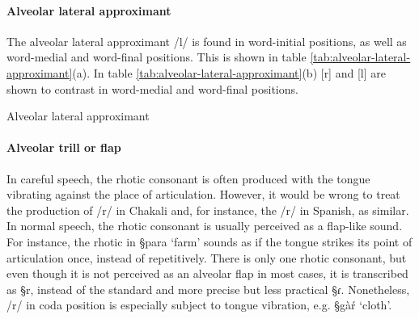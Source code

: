 \paragraph{Alveolar lateral approximant}

The alveolar lateral approximant /l/ is found in word-initial positions, as well
as word-medial and word-final positions. This is shown in table
\ref{tab:alveolar-lateral-approximant}(a).   In table
\ref{tab:alveolar-lateral-approximant}(b)  [r] and  [l] are shown to contrast in
word-medial and word-final positions.

\begin{table}[htb]
\centering
\caption{Alveolar lateral approximant\label{tab:alveolar-lateral-approximant}}
\quad
{}


\end{table}


\paragraph{Alveolar trill or flap}

 In careful speech,  the rhotic consonant is often produced with the tongue
vibrating against the place of articulation. However,
it would be wrong to treat  the production of /r/ in Chakali  and, for instance,
the /r/ in
Spanish, as similar. In normal speech,  the rhotic consonant is
usually perceived  as a flap-like sound. For instance,  the 
rhotic in {\S para} `farm' sounds as if the tongue strikes its point of
articulation once, instead of repetitively. There is only one rhotic consonant,
but  even though it is not perceived as an alveolar flap in most cases, it is
transcribed as {\S r},  instead of the standard and more precise but less
practical {\S ɾ}.  Nonetheless,   /r/ in coda position is especially subject to
tongue vibration, e.g. {\S gàŕ} `cloth'. 

